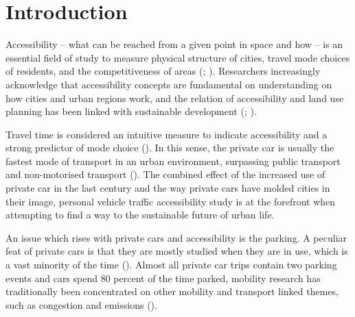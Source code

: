 \section{Introduction}
\justify

Accessibility -- what can be reached from a given point in space and how -- is an essential field of study to measure physical structure of cities, travel mode choices of residents, and the competitiveness of areas (\cite{Bertolini2005}; \cite{Toivonen2014a}). Researchers increasingly acknowledge that accessibility concepts are fundamental on understanding on how cities and urban regions work, and the relation of accessibility and land use planning has been linked with sustainable development (\cite{TeBrommelstroet2014}; \cite{Wegener1999}).

Travel time is considered an intuitive measure to indicate accessibility and a strong predictor of mode choice (\cite{Frank2008}). In this sense, the private car is usually the fastest mode of transport in an urban environment, surpassing public transport and non-motorised transport (\cite{Salonen2014}). The combined effect of the increased use of private car in the last century and the way private cars have molded cities in their image, personal vehicle traffic accessibility study is at the forefront when attempting to find a way to the sustainable future of urban life. 

An issue which rises with private cars and accessibility is the parking. A peculiar feat of private cars is that they are mostly studied when they are in use, which is a vast minority of the time (\cite{Diallo2015}). Almost all private car trips contain two parking events and cars spend 80 percent of the time parked, mobility research has traditionally been concentrated on other mobility and transport linked themes, such as congestion and emissions (\cite{Bates2012}). 

